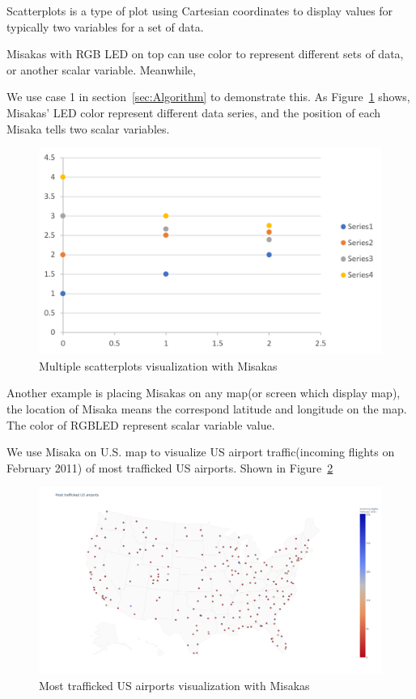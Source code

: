 \documentclass[conference]{IEEEtran}
\begin{document}
Scatterplots is a type of plot using Cartesian coordinates to display values for typically two variables for a set of data. 

Misakas with RGB LED on top can use color to represent different sets of data, or another scalar variable. Meanwhile, 

We use case 1 in section~\ref{sec:Algorithm} to demonstrate this. As Figure~\ref{fig:scatterplots1} shows, Misakas’ LED color represent different data series, and the position of each Misaka tells two scalar variables. 

\begin{figure}[htbp]
    \centering
    \includegraphics[width=\columnwidth]{scatterplots1.png}
    \caption{Multiple scatterplots visualization with Misakas}
    \label{fig:scatterplots1}
\end{figure}

Another example is placing Misakas on any map(or screen which display map), the location of Misaka means the correspond latitude and longitude on the map. The color of RGBLED represent scalar variable value.

We use Misaka on U.S. map to visualize US airport traffic(incoming flights on February 2011) of most trafficked US airports. Shown in Figure~\ref{fig:scatterplots2}

\begin{figure}[htbp]
    \centering
    \includegraphics[width=\columnwidth]{scatterplots2.png}
    \caption{Most trafficked US airports visualization with Misakas}
    \label{fig:scatterplots2}
\end{figure}
\end{document}
